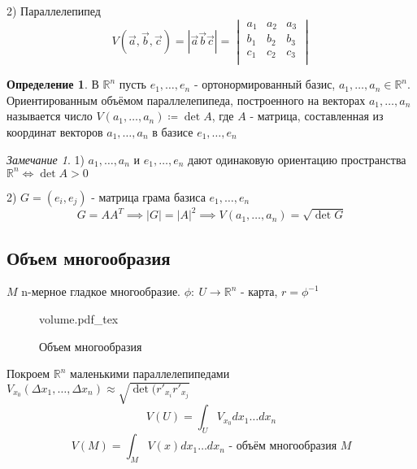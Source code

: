 \documentclass[a4paper]{article}
\newcommand{\incfig}[1]{%
\def\svgwidth{\columnwidth}
{#1.pdf_tex}
}
\theoremstyle{definition}
\newtheorem*{definition}{Определение}
\theoremstyle{remark}
\newtheorem*{remark}{Замечание}
\begin{document}
2) Параллелепипед
\[
    V(\vec{a}, \vec{b}, \vec{c}) = |\vec{a} \vec{b} \vec{c}| = 
    \begin{vmatrix}
    a_1 & a_2 & a_3\\
    b_1 & b_2 & b_3\\
    c_1 & c_2 & c_3\\
    
    \end{vmatrix}
\]

\begin{tcolorbox}
\begin{definition}
    В $ \mathbb{R}^n $ пусть $ e_1, \dots, e_n $ - ортонормированный базис,
    $ a_1, \dots, a_n \in \mathbb{R}^n $. Ориентированным объёмом параллелепипеда,
    построенного на векторах $ a_1, \dots, a_n $ называется число $ V(a_1, \dots, a_n)
    \coloneq \det A$, где $ A $ - матрица, составленная из координат векторов
    $ a_1, \dots, a_n $ в базисе $ e_1, \dots, e_n $ 
\end{definition}
\end{tcolorbox}

\begin{tcolorbox}
\begin{remark}
    1) $ a_1, \dots, a_n  $ и  $ e_1, \dots, e_n $ дают одинаковую ориентацию
    пространства $ \mathbb{R}^n \iff \det A > 0 $ 

    2) $ G = (e_i, e_j) $ - матрица грама базиса $ e_1, \dots, e_n $ 
    \[
        G = A A^T \implies |G| = |A|^2 \implies
        V(a_1, \dots, a_n) = \sqrt{\det G} 
    \]
\end{remark}
\end{tcolorbox}

\subsection*{Объем многообразия}

$ M $ n-мерное гладкое многообразие. $ \phi: \ U \to \mathbb{R}^n $ - карта,
$ r = \phi^{-1} $ 

\begin{figure}[ht]
    \centering
    \incfig{volume}
    \caption{Объем многообразия}
    \label{fig:volume}
\end{figure}

Покроем $ \mathbb{R}^n $ маленькими параллелепипедами $ V_{x_0}(\Delta x_1, \dots,
\Delta x_n) \approx \sqrt{\det (r'_{x_i} r'_{x_j}} $ 
\[
    V(U) = \int_{U} V_{x_0} dx_1 \dots dx_n
\]
\[
    V(M) = \int_{M} V(x) d x_1 \dots d x_n \text{ - объём многообразия } M
\]
\end{document}
